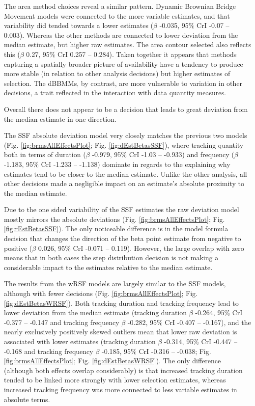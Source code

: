 \documentclass[10pt,a4paper]{article}
\begin{document}
The area method choices reveal a similar pattern.
Dynamic Brownian Bridge Movement models were connected to the more variable estimates, and that variability did tended towards a lower estimates (\(\beta\) -0.035, 95\% CrI -0.07 -- 0.003).
Whereas the other methods are connected to lower deviation from the median estimate, but higher raw estimates.
The area contour selected also reflects this (\(\beta\) 0.27, 95\% CrI 0.257 -- 0.284).
Taken together it appears that methods capturing a spatially broader picture of availability have a tendency to produce more stable (in relation to other analysis decisions) but higher estimates of selection.
The dBBMMs, by contrast, are more vulnerable to variation in other decisions, a trait reflected in the interaction with data quantity measures.

Overall there does not appear to be a decision that leads to great deviation from the median estimate in one direction.

The SSF absolute deviation model very closely matches the previous two models (Fig. \ref{fig:brmsAllEffectsPlot}; Fig. \ref{fig:dEstBetasSSF}), where tracking quantity both in terms of duration (\(\beta\) -0.979, 95\% CrI -1.03 -- -0.933) and frequency (\(\beta\) -1.183, 95\% CrI -1.233 -- -1.138) dominate in regards to the explaining why estimates tend to be closer to the median estimate.
Unlike the other analysis, all other decisions made a negligible impact on an estimate's absolute proximity to the median estimate.

Due to the one sided variability of the SSF estimates the raw deviation model mostly mirrors the absolute deviations (Fig. \ref{fig:brmsAllEffectsPlot}; Fig. \ref{fig:rEstBetasSSF}).
The only noticeable difference is in the model formula decision that changes the direction of the beta point estimate from negative to positive (\(\beta\) 0.026, 95\% CrI -0.071 -- 0.119).
However, the large overlap with zero means that in both cases the step distribution decision is not making a considerable impact to the estimates relative to the median estimate.

The results from the wRSF models are largely similar to the SSF models, although with fewer decisions (Fig. \ref{fig:brmsAllEffectsPlot}; Fig. \ref{fig:dEstBetasWRSF}).
Both tracking duration and tracking frequency lead to lower deviation from the median estimate (tracking duration \(\beta\) -0.264, 95\% CrI -0.377 -- -0.147 and tracking frequency \(\beta\) -0.282, 95\% CrI -0.407 -- -0.167), and the nearly exclusively positively skewed outliers mean that lower raw deviation is associated with lower estimates (tracking duration \(\beta\) -0.314, 95\% CrI -0.447 -- -0.168 and tracking frequency \(\beta\) -0.185, 95\% CrI -0.316 -- -0.038; Fig. \ref{fig:brmsAllEffectsPlot}; Fig. \ref{fig:dEstBetasWRSF}).
The only difference (although both effects overlap considerably) is that increased tracking duration tended to be linked more strongly with lower selection estimates, whereas increased tracking frequency was more connected to less variable estimates in absolute terms.
\end{document}
